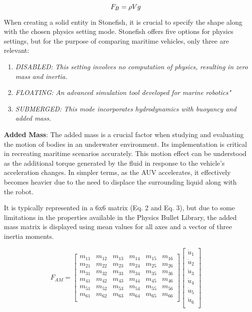\documentclass[]{article}
\begin{document}
		\begin{equation}
			F_{B} = \rho Vg \\
		\end{equation}
		
		When creating a solid entity in Stonefish, it is crucial to specify the shape along with the chosen physics setting mode. Stonefish offers five options for physics settings, but for the purpose of comparing maritime vehicles, only three are relevant:
		
		\begin{enumerate}
			\item\textit{DISABLED:} \textit{This setting involves no computation of physics, resulting in zero mass and inertia.} 
			\item\textit{FLOATING:} \textit{An advanced simulation tool developed for marine robotics"} 
			\item\textit{SUBMERGED:} \textit{This mode incorporates hydrodynamics with buoyancy and added mass.}
		\end{enumerate}
		
		\textbf{Added Mass}: The added mass is a crucial factor when studying and evaluating the motion of bodies in an underwater environment. Its implementation is critical in recreating maritime scenarios accurately. This motion effect can be understood as the additional torque generated by the fluid in response to the vehicle's acceleration changes. In simpler terms, as the AUV accelerates, it effectively becomes heavier due to the need to displace the surrounding liquid along with the robot.
		
		It is typically represented in a 6x6 matrix (Eq. 2 and Eq. 3), but due to some limitations in the properties available in the Physics Bullet Library, the added mass matrix is displayed using mean values for all axes and a vector of three inertia moments.
		
		\begin{equation}
			F_{AM} = \begin{bmatrix}
				m_{11} & m_{12} & m_{13} & m_{14} & m_{15} & m_{16}\\
				m_{21} & m_{22} & m_{23} & m_{24} & m_{25} & m_{26} \\
				m_{31} & m_{32} & m_{33} & m_{34} & m_{35} & m_{36} \\
				m_{41} & m_{42} & m_{43} & m_{44} & m_{45} & m_{46} \\
				m_{51} & m_{52} & m_{53} & m_{54} & m_{55} & m_{56} \\
				m_{61} & m_{62} & m_{63} & m_{64} & m_{65} & m_{66} \\
					\end{bmatrix} \begin{bmatrix}
					\dot u_{1} \\
					\dot u_{2} \\
					\dot u_{3} \\
					\dot u_{4} \\
					\dot u_{5} \\
					\dot u_{6} \\
				\end{bmatrix}		
		\end{equation}
	
\end{document}
